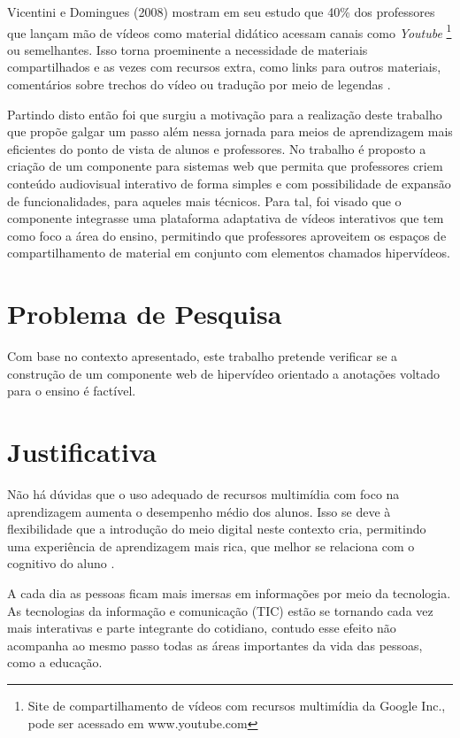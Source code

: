 Vicentini e Domingues (2008) mostram em seu estudo que 40\% dos professores que lançam mão de vídeos como material didático acessam canais como \textit{Youtube} \footnote{Site de compartilhamento de vídeos com recursos multimídia da Google Inc., pode ser acessado em www.youtube.com} ou semelhantes. Isso torna proeminente a necessidade de materiais compartilhados e as vezes com recursos extra, como links para outros materiais, comentários sobre trechos do vídeo ou tradução por meio de legendas \cite{vicentini2008uso}.

Partindo disto então foi que surgiu a motivação para a realização deste trabalho que propõe galgar um passo além nessa jornada para meios de aprendizagem mais eficientes do ponto de vista de alunos e professores. No trabalho é proposto a criação de um componente para sistemas web que permita que professores criem conteúdo audiovisual interativo de forma simples e com possibilidade de expansão de funcionalidades, para aqueles mais técnicos. Para tal, foi visado que o componente integrasse uma plataforma adaptativa de vídeos interativos que tem como foco a área do ensino, permitindo que professores aproveitem os espaços de compartilhamento de material em conjunto com elementos chamados hipervídeos.

\section{Problema de Pesquisa}

Com base no contexto apresentado, este trabalho pretende verificar se a construção de um componente web de hipervídeo orientado a anotações voltado para o ensino é factível.

\section{Justificativa}

Não há dúvidas que o uso adequado de recursos multimídia com foco na aprendizagem aumenta o desempenho médio dos alunos. Isso se deve à flexibilidade que a introdução do meio digital neste contexto cria, permitindo uma experiência de aprendizagem mais rica, que melhor se relaciona com o cognitivo do aluno \cite{moreno2000, zhang2005}.

A cada dia as pessoas ficam mais imersas em informações por meio da tecnologia. As tecnologias da informação e comunicação (TIC) estão se tornando cada vez mais interativas e parte integrante do cotidiano, contudo esse efeito não acompanha ao mesmo passo todas as áreas importantes da vida das pessoas, como a educação.

